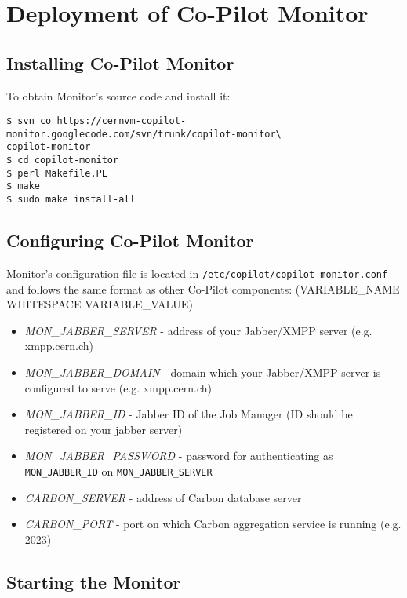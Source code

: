 \section{Deployment of Co-Pilot Monitor}

\subsection{Installing Co-Pilot Monitor}

To obtain Monitor's source code and install it:
\lstset{caption=Installing the Monitor}
\begin{lstlisting}
$ svn co https://cernvm-copilot-monitor.googlecode.com/svn/trunk/copilot-monitor\
copilot-monitor
$ cd copilot-monitor
$ perl Makefile.PL
$ make
$ sudo make install-all
\end{lstlisting}

\subsection{Configuring Co-Pilot Monitor}

Monitor's configuration file is located in \texttt{/etc/copilot/copilot-monitor.conf} and follows the same format as other Co-Pilot components: (VARIABLE\_NAME WHITESPACE VARIABLE\_VALUE).

\begin{itemize}
  \item \emph{MON\_JABBER\_SERVER} - address of your Jabber/XMPP server (e.g. xmpp.cern.ch)
  \item \emph{MON\_JABBER\_DOMAIN} - domain which your Jabber/XMPP server is configured to serve (e.g. xmpp.cern.ch)
  \item \emph{MON\_JABBER\_ID} - Jabber ID of the Job Manager (ID should be registered on your jabber server)
  \item \emph{MON\_JABBER\_PASSWORD} - password for authenticating as \texttt{MON\_JABBER\_ID} on \texttt{MON\_JABBER\_SERVER}
  \item \emph{CARBON\_SERVER} - address of Carbon database server
  \item \emph{CARBON\_PORT} - port on which Carbon aggregation service is running (e.g. 2023)
\end{itemize}

\subsection{Starting the Monitor}

